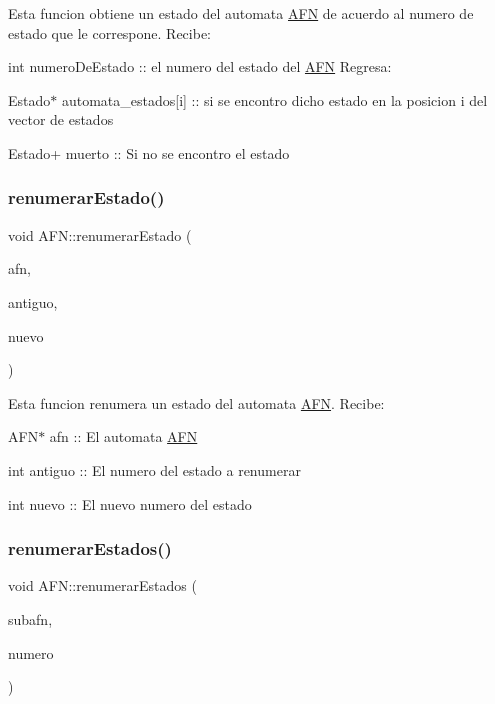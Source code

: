 Esta funcion obtiene un estado del automata \hyperlink{class_a_f_n}{A\+FN} de acuerdo al numero de estado que le correspone. Recibe\+:
\begin{DoxyItemize}
\item int numero\+De\+Estado \+:\+: el numero del estado del \hyperlink{class_a_f_n}{A\+FN} Regresa\+:
\item Estado$\ast$ automata\+\_\+estados\mbox{[}i\mbox{]} \+:\+: si se encontro dicho estado en la posicion i del vector de estados
\item Estado+ muerto \+:\+: Si no se encontro el estado 
\end{DoxyItemize}\mbox{\label{class_a_f_n_aae3289b516c0cbf17759c279f1544e09}} 
\subsubsection{\texorpdfstring{renumerar\+Estado()}{renumerarEstado()}}
{\footnotesize\ttfamily void A\+F\+N\+::renumerar\+Estado (\begin{DoxyParamCaption}\item[{\hyperlink{class_a_f_n}{A\+FN} $\ast$}]{afn,  }\item[{int}]{antiguo,  }\item[{int}]{nuevo }\end{DoxyParamCaption})}

Esta funcion renumera un estado del automata \hyperlink{class_a_f_n}{A\+FN}. Recibe\+:
\begin{DoxyItemize}
\item A\+F\+N$\ast$ afn \+:\+: El automata \hyperlink{class_a_f_n}{A\+FN}
\item int antiguo \+:\+: El numero del estado a renumerar
\item int nuevo \+:\+: El nuevo numero del estado 
\end{DoxyItemize}\mbox{\label{class_a_f_n_a3722c00ec07a1df9887336a48ce33050}} 
\subsubsection{\texorpdfstring{renumerar\+Estados()}{renumerarEstados()}}
{\footnotesize\ttfamily void A\+F\+N\+::renumerar\+Estados (\begin{DoxyParamCaption}\item[{\hyperlink{class_a_f_n}{A\+FN} $\ast$}]{subafn,  }\item[{int}]{numero }\end{DoxyParamCaption})}

